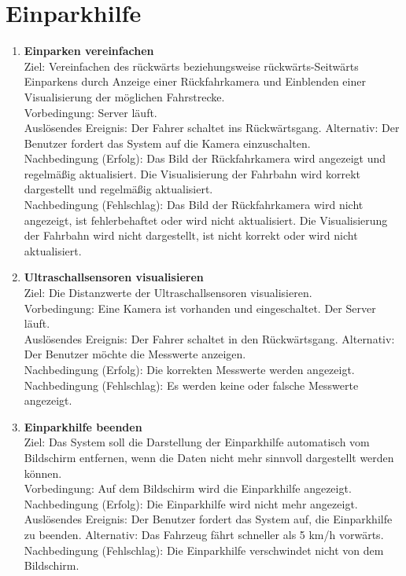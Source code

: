 \documentclass[pflichtenheft.tex]{subfiles}
\begin{document}
	\section{{Einparkhilfe}}
	
	\begin{enumerate}
	\setcounter{enumi}{\value{enumTemp}}

	\item{\textbf{Einparken vereinfachen}} \\ Ziel: Vereinfachen des rückwärts beziehungsweise rückwärts-Seitwärts Einparkens durch Anzeige einer Rückfahrkamera und Einblenden einer Visualisierung der möglichen Fahrstrecke. \\ Vorbedingung: Server läuft. \\ Auslösendes Ereignis:  Der Fahrer schaltet ins Rückwärtsgang. Alternativ: Der Benutzer fordert das System auf die Kamera einzuschalten. \\ Nachbedingung (Erfolg): Das Bild der Rückfahrkamera wird angezeigt und regelmäßig aktualisiert. Die Visualisierung der Fahrbahn wird korrekt dargestellt und regelmäßig aktualisiert. \\ Nachbedingung (Fehlschlag): Das Bild der Rückfahrkamera wird nicht angezeigt, ist fehlerbehaftet oder wird nicht aktualisiert. Die Visualisierung der Fahrbahn wird nicht dargestellt, ist nicht korrekt oder wird nicht aktualisiert. 

	\item{\textbf{Ultraschallsensoren visualisieren}} \\ Ziel: Die Distanzwerte der Ultraschallsensoren visualisieren. \\ Vorbedingung: Eine Kamera ist vorhanden und eingeschaltet. Der Server läuft. \\ Auslösendes Ereignis: Der Fahrer schaltet in den Rückwärtsgang. Alternativ: Der Benutzer möchte die Messwerte anzeigen.\\ Nachbedingung (Erfolg): Die korrekten Messwerte werden angezeigt. \\ Nachbedingung (Fehlschlag): Es werden keine oder falsche Messwerte angezeigt.

	\item{\textbf{Einparkhilfe beenden}} \\ Ziel: Das System soll die Darstellung der Einparkhilfe automatisch vom Bildschirm entfernen, wenn die Daten nicht mehr sinnvoll dargestellt werden können. \\ Vorbedingung: Auf dem Bildschirm wird die Einparkhilfe angezeigt. \\ Nachbedingung (Erfolg): Die Einparkhilfe wird nicht mehr angezeigt. \\ Auslösendes Ereignis: Der Benutzer fordert das System auf, die Einparkhilfe zu beenden. Alternativ: Das Fahrzeug fährt schneller als 5 km/h vorwärts. \\  Nachbedingung (Fehlschlag): Die Einparkhilfe verschwindet nicht von dem Bildschirm.

	\setcounter{enumTemp}{\value{enumi}}

	\end{enumerate}
	
\end{document}

